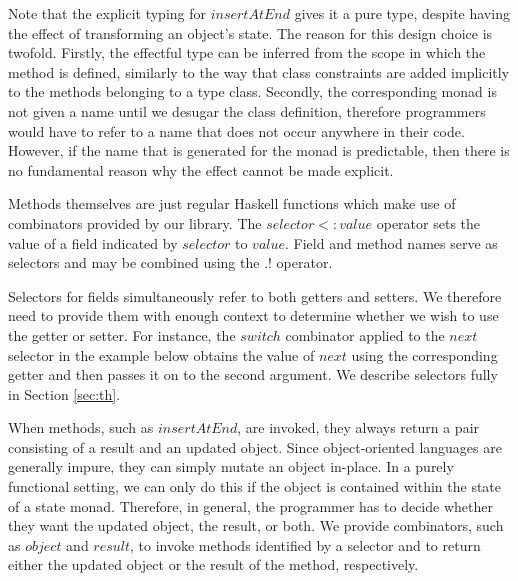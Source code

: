 Note that the explicit typing for $\mathit{insertAtEnd}$ gives it a pure type, despite having the effect of transforming an object's state. The reason for this design choice is twofold. Firstly, the effectful type can be inferred from the scope in which the method is defined, similarly to the way that class constraints are added implicitly to the methods belonging to a type class. Secondly, the corresponding monad is not given a name until we desugar the class definition, therefore programmers would have to refer to a name that does not occur anywhere in their code. However, if the name that is generated for the monad is predictable, then there is no fundamental reason why the effect cannot be made explicit.

Methods themselves are just regular Haskell functions which make use of combinators provided by our library. The $\mathit{selector} <: \mathit{value}$ operator sets the value of a field indicated by $\mathit{selector}$ to $\mathit{value}$. Field and method names serve as selectors and may be combined using the $.!$ operator. 

Selectors for fields simultaneously refer to both getters and setters. We therefore need to provide them with enough context to determine whether we wish to use the getter or setter. For instance, the $\mathit{switch}$ combinator applied to the $\mathit{next}$ selector in the example below obtains the value of $\mathit{next}$ using the corresponding getter and then passes it on to the second argument. We describe selectors fully in Section \ref{sec:th}.

When methods, such as $\mathit{insertAtEnd}$, are invoked, they always return a pair consisting of a result and an updated object. Since object-oriented languages are generally impure, they can simply mutate an object in-place. In a purely functional setting, we can only do this if the object is contained within the state of a state monad. Therefore, in general, the programmer has to decide whether they want the updated object, the result, or both. We provide combinators, such as $\mathit{object}$ and $\mathit{result}$, to invoke methods identified by a selector and to return either the updated object or the result of the method, respectively.

